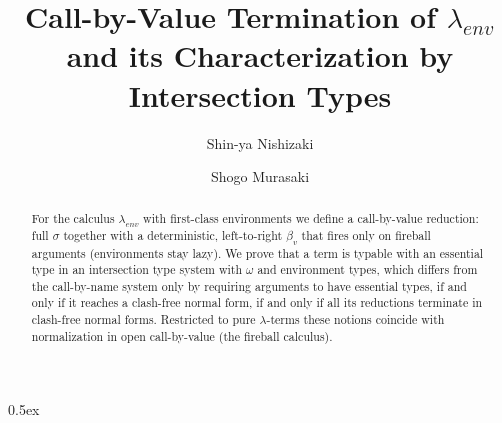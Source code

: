 \documentclass[11pt,a4paper]{article}
\begin{document}
\title{Call-by-Value Termination of $\lambda_{env}$\\and its Characterization by Intersection Types}
\author{Shin-ya Nishizaki \and Shogo Murasaki}
\maketitle

\begin{abstract}
For the calculus $\lambda_{env}$ with first-class environments we define a call-by-value
reduction: full $\sigma$ together with a deterministic, left-to-right $\beta_v$ that fires
only on fireball arguments (environments stay lazy).  We prove that a term is typable with
an essential type in an intersection type system with $\omega$ and environment types,
which differs from the call-by-name system only by requiring arguments to have essential
types, if and only if it reaches a clash-free normal form, if and only if all its
reductions terminate in clash-free normal forms.  Restricted to pure $\lambda$-terms these
notions coincide with normalization in open call-by-value (the fireball calculus).
\end{abstract}

\tableofcontents

\parindent 0pt\parskip 0.5ex


\end{document}

